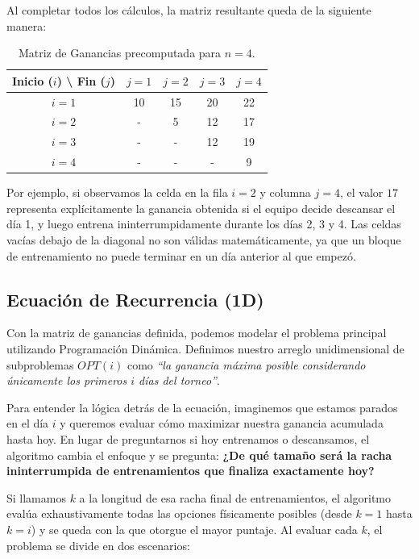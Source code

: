 Al completar todos los cálculos, la matriz resultante queda de la siguiente manera:

\begin{table}[h]
\centering
\begin{tabular}{|c|c|c|c|c|}
\hline
\textbf{Inicio ($i$) \textbackslash{} Fin ($j$)} & \textbf{$j=1$} & \textbf{$j=2$} & \textbf{$j=3$} & \textbf{$j=4$} \\ \hline
\textbf{$i=1$} & 10 & 15 & 20 & 22 \\ \hline
\textbf{$i=2$} & -  & 5  & 12 & 17 \\ \hline
\textbf{$i=3$} & -  & -  & 12 & 19 \\ \hline
\textbf{$i=4$} & -  & -  & -  & 9  \\ \hline
\end{tabular}
\caption{Matriz de Ganancias precomputada para $n=4$.}
\label{tabla-ganancias}
\end{table}

Por ejemplo, si observamos la celda en la fila $i=2$ y columna $j=4$, el valor $17$ representa explícitamente la ganancia obtenida si el equipo decide descansar el día 1, y luego entrena ininterrumpidamente durante los días 2, 3 y 4. Las celdas vacías debajo de la diagonal no son válidas matemáticamente, ya que un bloque de entrenamiento no puede terminar en un día anterior al que empezó.

\subsection{Ecuación de Recurrencia (1D)}

Con la matriz de ganancias definida, podemos modelar el problema principal utilizando Programación Dinámica. Definimos nuestro arreglo unidimensional de subproblemas $OPT(i)$ como \textit{``la ganancia máxima posible considerando únicamente los primeros $i$ días del torneo''}.

Para entender la lógica detrás de la ecuación, imaginemos que estamos parados en el día $i$ y queremos evaluar cómo maximizar nuestra ganancia acumulada hasta hoy. En lugar de preguntarnos si hoy entrenamos o descansamos, el algoritmo cambia el enfoque y se pregunta: \textbf{¿De qué tamaño será la racha ininterrumpida de entrenamientos que finaliza exactamente hoy?}

Si llamamos $k$ a la longitud de esa racha final de entrenamientos, el algoritmo evalúa exhaustivamente todas las opciones físicamente posibles (desde $k=1$ hasta $k=i$) y se queda con la que otorgue el mayor puntaje. Al evaluar cada $k$, el problema se divide en dos escenarios:


